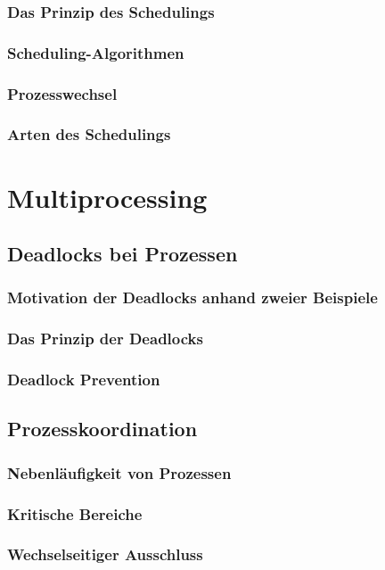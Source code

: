 \documentclass{article}
\begin{document}
\subsubsection{Das Prinzip des Schedulings}
\subsubsection{Scheduling-Algorithmen}
\subsubsection{Prozesswechsel}
\subsubsection{Arten des Schedulings}

\newpage
\section{Multiprocessing}
\subsection{Deadlocks bei Prozessen}
\subsubsection{Motivation der Deadlocks anhand zweier Beispiele}
\subsubsection{Das Prinzip der Deadlocks}
\subsubsection{Deadlock Prevention}
\subsection{Prozesskoordination}
\subsubsection{Nebenläufigkeit von Prozessen}
\subsubsection{Kritische Bereiche}
\subsubsection{Wechselseitiger Ausschluss}
\end{document}
